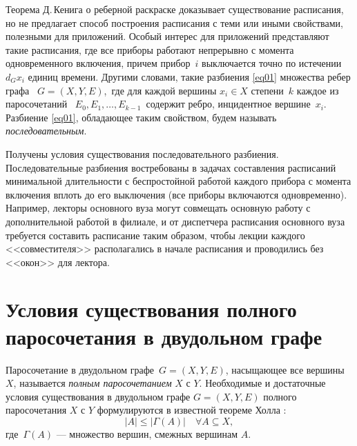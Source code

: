 Теорема Д.\,Кенига о реберной раскраске доказывает существование расписания, но не предлагает способ построения расписания с теми или иными свойствами, полезными для приложений. Особый интерес для приложений представляют такие расписания, где все приборы работают непрерывно с момента одновременного включения, причем прибор\ $i$ выключается точно по истечении\ $d_G x_i$ единиц времени. Другими словами, такие разбиения \eqref{eq01} множества ребер графа \ $G=(X,Y,E)$,\ где для каждой вершины $x_i\in X$ степени\ $k$ каждое из паросочетаний \ $E_0,E_1,\dots, E_{k-1}$\ содержит ребро, инцидентное вершине\ $x_i$. Разбиение \eqref{eq01}, обладающее таким свойством, будем называть \textit{ последовательным}.
\par\medskip
Получены условия существования последовательного разбиения. Последовательные разбиения востребованы в задачах составления расписаний минимальной длительности с беспростойной работой каждого прибора с момента включения вплоть до его выключения (все приборы включаются одновременно). Например, лекторы основного вуза могут совмещать основную работу с дополнительной работой в филиале, и от диспетчера расписания основного вуза требуется составить расписание таким образом, чтобы лекции каждого <<совместителя>> располагались в начале расписания и проводились без <<окон>> для лектора.
\section{Условия существования полного паросочетания в двудольном графе}

Паросочетание в двудольном графе\ $G=(X,Y,E)$, насыщающее все вершины $X$, называется \textit{ полным паросочетанием} $X$ с $Y$.
Необходимые и достаточные условия существования в двудольном графе $G=(X,Y,E)$ полного паросочетания $X$  с $Y$  формулируются в известной теореме Холла \cite[c.\,164]{akm-1}:
\begin{equation}\label {eq02}
|A| \leqslant |\Gamma(A)|\quad \forall A\subseteq X,
\end{equation}
где\ $\Gamma(A)$ ---  множество вершин, смежных вершинам $A$.

